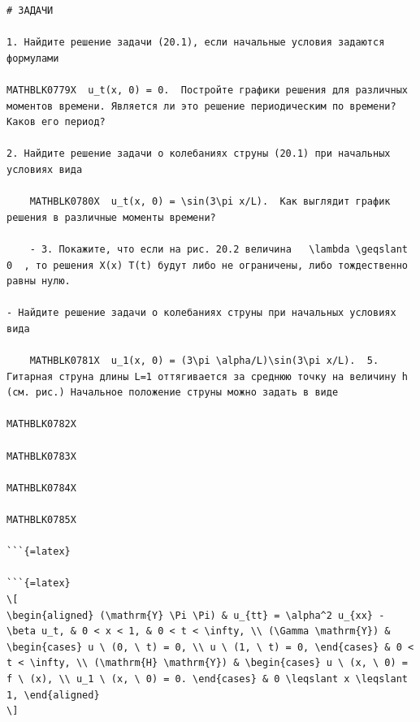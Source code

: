 \documentclass[
]{article}
\begin{document}
\begin{verbatim}
# ЗАДАЧИ

1. Найдите решение задачи (20.1), если начальные условия задаются формулами

MATHBLK0779X  u_t(x, 0) = 0.  Постройте графики решения для различных моментов времени. Является ли это решение периодическим по времени? Каков его период?

2. Найдите решение задачи о колебаниях струны (20.1) при начальных условиях вида

    MATHBLK0780X  u_t(x, 0) = \sin(3\pi x/L).  Как выглядит график решения в различные моменты времени?

    - 3. Покажите, что если на рис. 20.2 величина   \lambda \geqslant 0  , то решения X(x) T(t) будут либо не ограничены, либо тождественно равны нулю.

- Найдите решение задачи о колебаниях струны при начальных условиях вида

    MATHBLK0781X  u_1(x, 0) = (3\pi \alpha/L)\sin(3\pi x/L).  5. Гитарная струна длины L=1 оттягивается за среднюю точку на величину h (см. рис.) Начальное положение струны можно задать в виде

MATHBLK0782X

MATHBLK0783X

MATHBLK0784X

MATHBLK0785X

```{=latex}

```{=latex}
\[
\begin{aligned} (\mathrm{Y} \Pi \Pi) & u_{tt} = \alpha^2 u_{xx} - \beta u_t, & 0 < x < 1, & 0 < t < \infty, \\ (\Gamma \mathrm{Y}) & \begin{cases} u \ (0, \ t) = 0, \\ u \ (1, \ t) = 0, \end{cases} & 0 < t < \infty, \\ (\mathrm{H} \mathrm{Y}) & \begin{cases} u \ (x, \ 0) = f \ (x), \\ u_1 \ (x, \ 0) = 0. \end{cases} & 0 \leqslant x \leqslant 1, \end{aligned}
\]
\end{verbatim}
\end{document}
